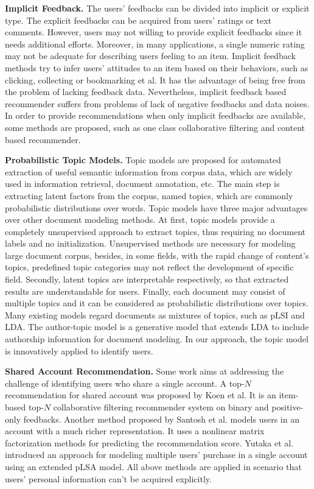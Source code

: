 \documentclass{llncs}
\begin{document}
\textbf{Implicit Feedback.} The users' feedbacks can be divided into implicit or explicit type. The explicit feedbacks can be acquired from users' ratings or text comments. However,  users may not willing to provide explicit feedbacks since it needs additional efforts. Moreover, in many applications, a single numeric rating may not be adequate for describing users feeling to an item. Implicit feedback methods\cite{song:mining} try to infer users' attitudes to an item based on their behaviors, such as clicking, collecting or bookmarking et al. It has the advantage of being free from the problem of lacking feedback data. Nevertheless, implicit feedback based recommender suffers from problems of lack of negative feedbacks and data noises. In order to provide recommendations when only implicit feedbacks are available, some methods are proposed, such as one class collaborative filtering and content based recommender.\par


\textbf{Probabilistic Topic Models.}  Topic models\cite{blei:lda}\cite{mic:atm}\cite{mark:prob} are proposed for automated extraction of useful semantic information from corpus data, which are widely used in information retrieval, document annotation, etc. The main step is extracting latent factors from the corpus, named topics, which are commonly probabilistic distributions over words. Topic models have three major advantages over other document modeling methods. At first, topic models provide a completely unsupervised approach to extract topics, thus requiring no document labels and no initialization. Unsupervised methods are necessary for modeling large document corpus, besides, in some fields, with the rapid change of content's topics, predefined topic categories may not reflect the development of specific field. Secondly, latent topics are interpretable respectively, so that extracted results are understandable for users. Finally, each document may consist of multiple topics and it can be considered as probabilistic distributions over topics. Many existing models regard documents as mixtures of topics, such as pLSI and LDA. The author-topic model is a generative model that extends LDA to include authorship information for document modeling. In our approach, the topic model is innovatively applied to identify users. \par

\textbf{Shared Account Recommendation.} Some work aims at addressing the challenge of identifying users who share a single account. A top-$N$ recommendation for shared account  was proposed by Koen et al\cite{koen:top-n}. It is an item-based top-$N$ collaborative filtering recommender system on binary and positive-only feedbacks. Another method proposed by Santosh et al.\cite{kabbur:nlmf} models users in an account with a much richer representation. It uses a nonlinear matrix factorization methods for predicting the recommendation score. Yutaka et al.\cite{yutaka:modeling} introduced an approach for modeling multiple users' purchase in a single account using an extended pLSA model. All above methods are applied in scenario that users' personal information can't be acquired explicitly.
\end{document}

